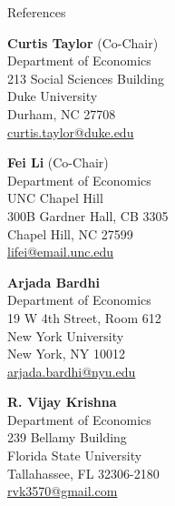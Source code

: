 \begin{rSection}{References}
	
	\medskip 
	\begin{center}
		\begin{minipage}{.31\linewidth}
			{\large \textbf{Curtis Taylor} (Co-Chair)}	\\[3pt]
			Department of Economics	\\		
			213 Social Sciences Building\\		
			Duke University\\		
			Durham, NC 27708\\[3pt]
			\href{mailto:curtis.taylor@duke.edu}{curtis.taylor@duke.edu}
		\end{minipage}
		\hspace*{80pt}
		\begin{minipage}{.31\linewidth}
			{\large \textbf{Fei Li} (Co-Chair) }	\\[3pt]
			Department of Economics\\
			UNC Chapel Hill\\
			300B Gardner Hall, CB 3305\\
			Chapel Hill, NC 27599\\[3pt]
			\href{mailto:lifei@email.unc.edu}{lifei@email.unc.edu}
		\end{minipage}
		
		\vspace*{20pt}
		
		\begin{minipage}{.31\linewidth}
			{\large \textbf{Arjada Bardhi}}	\\[3pt]
			Department of Economics	\\		
			19 W 4th Street, Room 612\\		
			New York University\\		
			New York, NY 10012\\[3pt]
			\href{mailto:arjada.bardhi@nyu.edu}{arjada.bardhi@nyu.edu}
		\end{minipage}
		\hspace*{80pt}
		\begin{minipage}{.31\linewidth}
			{\large \textbf{R. Vijay Krishna}}	\\[3pt]
			Department of Economics	\\		
			239 Bellamy Building\\		
			Florida State University\\		
			Tallahassee, FL 32306-2180\\[3pt]
			\href{mailto:rvk3570@gmail.com}{rvk3570@gmail.com}
		\end{minipage}
	\end{center}
	
	
	
	
\end{rSection}
	

